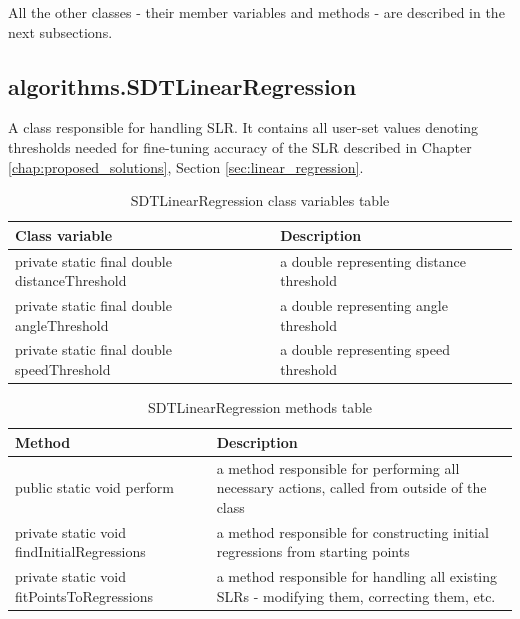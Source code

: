 	All the other classes - their member variables and methods - are described in the next subsections.
	
\subsection{algorithms.SDTLinearRegression}\label{subsec:slr}

	A class responsible for handling SLR. It contains all user-set values denoting thresholds needed for fine-tuning accuracy of the SLR described in Chapter \ref{chap:proposed_solutions}, Section \ref{sec:linear_regression}.
	
\begin{table}[H]
\centering
\setlength{\extrarowheight}{2pt}
\begin{tabularx}{\textwidth}{|X|X|}
\hline
\textbf{Class variable} & \textbf{Description} \\ \hline
private static final double \mbox{distanceThreshold} & a double representing distance threshold \\ \hline
private static final double \mbox{angleThreshold} & a double representing angle threshold    \\ \hline
private static final double \mbox{speedThreshold} & a double representing speed threshold    \\ \hline
\end{tabularx}
\caption{SDTLinearRegression class variables table}
\label{tab:class_variables_LR}
\end{table}

\begin{table}[H]
\centering
\setlength{\extrarowheight}{2pt}
\begin{tabularx}{\textwidth}{|X|X|}
\hline
\textbf{Method} & \textbf{Description} \\ \hline
public static void \mbox{perform} & a method responsible for performing all necessary actions, called from outside of the class \\ \hline
private static void \mbox{findInitialRegressions} & a method responsible for constructing initial regressions from starting points\\ \hline
private static void \mbox{fitPointsToRegressions} & a method responsible for handling all existing SLRs - modifying them, correcting them, etc.\\ \hline
\end{tabularx}
\caption{SDTLinearRegression methods table}
\label{tab:class_methods_LR}
\end{table}

